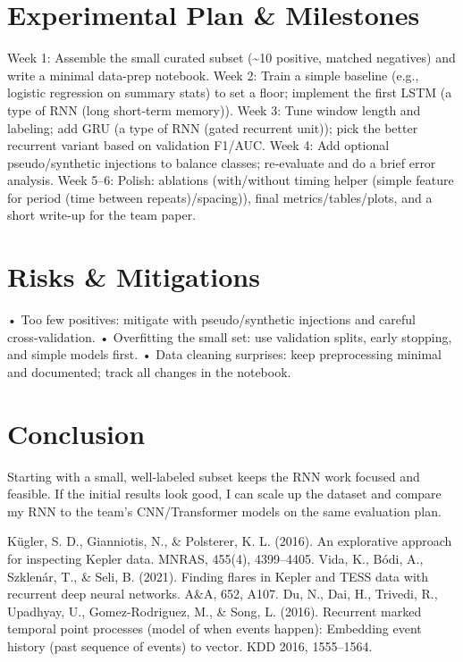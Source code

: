 \documentclass[letterpaper]{article}
\begin{document}
\section{Experimental Plan \& Milestones}
Week 1: Assemble the small curated subset (\textasciitilde{}10 positive, matched negatives) and write a minimal data-prep notebook.
Week 2: Train a simple baseline (e.g., logistic regression on summary stats) to set a floor; implement the first LSTM (a type of RNN (long short-term memory)).
Week 3: Tune window length and labeling; add GRU (a type of RNN (gated recurrent unit)); pick the better recurrent variant based on validation F1/AUC.
Week 4: Add optional pseudo/synthetic injections to balance classes; re‑evaluate and do a brief error analysis.
Week 5–6: Polish: ablations (with/without timing helper (simple feature for period (time between repeats)/spacing)), final metrics/tables/plots, and a short write‑up for the team paper.

\section{Risks \& Mitigations}
• Too few positives: mitigate with pseudo/synthetic injections and careful cross‑validation.
• Overfitting the small set: use validation splits, early stopping, and simple models first.
• Data cleaning surprises: keep preprocessing minimal and documented; track all changes in the notebook.

\section{Conclusion}
Starting with a small, well‑labeled subset keeps the RNN work focused and feasible. If the initial results look good, I can scale up the dataset and compare my RNN to the team’s CNN/Transformer models on the same evaluation plan.

\begin{thebibliography}{99}
 Kügler, S. D., Gianniotis, N., \& Polsterer, K. L. (2016). An explorative approach for inspecting Kepler data. MNRAS, 455(4), 4399–4405.
 Vida, K., Bódi, A., Szklenár, T., \& Seli, B. (2021). Finding flares in Kepler and TESS data with recurrent deep neural networks. A\&A, 652, A107.
 Du, N., Dai, H., Trivedi, R., Upadhyay, U., Gomez-Rodriguez, M., \& Song, L. (2016). Recurrent marked temporal point processes (model of when events happen): Embedding event history (past sequence of events) to vector. KDD 2016, 1555–1564.
\end{thebibliography}
\end{document}
